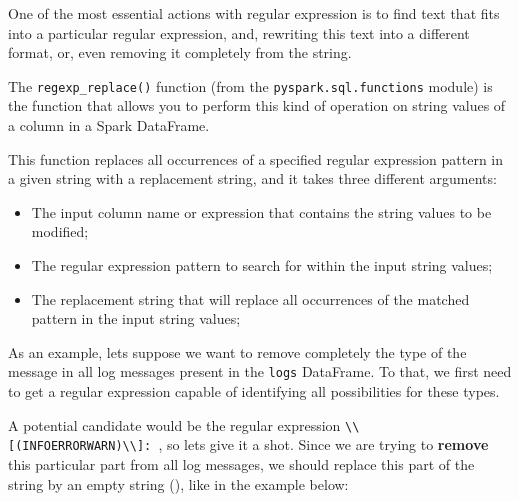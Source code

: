 \documentclass[
  11pt,
  letterpaper,
  DIV=11,
  numbers=noendperiod]{scrreprt}
\providecommand{\tightlist}{%
  \setlength{\itemsep}{0pt}\setlength{\parskip}{0pt}}\usepackage{longtable,booktabs,array}
\begin{document}
One of the most essential actions with regular expression is to find
text that fits into a particular regular expression, and, rewriting this
text into a different format, or, even removing it completely from the
string.

The \texttt{regexp\_replace()} function (from the
\texttt{pyspark.sql.functions} module) is the function that allows you
to perform this kind of operation on string values of a column in a
Spark DataFrame.

This function replaces all occurrences of a specified regular expression
pattern in a given string with a replacement string, and it takes three
different arguments:

\begin{itemize}
\tightlist
\item
  The input column name or expression that contains the string values to
  be modified;
\item
  The regular expression pattern to search for within the input string
  values;
\item
  The replacement string that will replace all occurrences of the
  matched pattern in the input string values;
\end{itemize}

As an example, lets suppose we want to remove completely the type of the
message in all log messages present in the \texttt{logs} DataFrame. To
that, we first need to get a regular expression capable of identifying
all possibilities for these types.

A potential candidate would be the regular expression
\texttt{\textquotesingle{}\textbackslash{}\textbackslash{}{[}(INFO\textbar{}ERROR\textbar{}WARN)\textbackslash{}\textbackslash{}{]}:\ \textquotesingle{}},
so lets give it a shot. Since we are trying to \textbf{remove} this
particular part from all log messages, we should replace this part of
the string by an empty string
(\texttt{\textquotesingle{}\textquotesingle{}}), like in the example
below:
\end{document}
